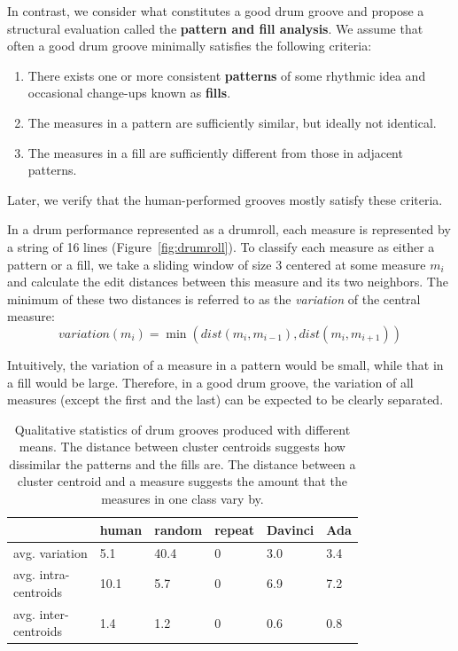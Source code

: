 \documentclass[letterpaper]{article} %
\begin{document}
In contrast, we consider what constitutes a good drum groove and propose a structural evaluation called the \textbf{pattern and fill analysis}. We assume that often a good drum groove minimally satisfies the following criteria:
\begin{enumerate}
    \item There exists one or more consistent \textbf{patterns} of some rhythmic idea and occasional change-ups known as \textbf{fills}.
    \item The measures in a pattern are sufficiently similar, but ideally not identical.
    \item The measures in a fill are sufficiently different from those in adjacent patterns.
\end{enumerate}

Later, we verify that the human-performed grooves mostly satisfy these criteria.

In a drum performance represented as a drumroll, each measure is represented by a string of 16 lines (Figure~\ref{fig:drumroll}). To classify each measure as either a pattern or a fill, we take a sliding window of size 3 centered at some measure $m_i$ and calculate the edit distances between this measure and its two neighbors. The minimum of these two distances is referred to as the \textit{variation} of the central measure:
$$\textit{variation}(m_i) = \min (dist(m_i,m_{i-1}),dist(m_i,m_{i+1}))$$

Intuitively, the variation of a measure in a pattern would be small, while that in a fill would be large. Therefore, in a good drum groove, the variation of all measures (except the first and the last) can be expected to be clearly separated.

\begin{table}[t!]
\small
\centering
\begin{tabular}{llllll}
\toprule
            & human & random & repeat & Davinci & Ada \\ \midrule
avg. variation   &  5.1  &  40.4 & 0  & 3.0  &  3.4   \\
\makecell[l]{avg. intra- \\ centroids}   &  10.1  &  5.7 & 0  & 6.9  &  7.2   \\
\makecell[l]{avg. inter- \\ centroids}   &  1.4  &  1.2 & 0  & 0.6  &  0.8   \\
\bottomrule
\end{tabular}
\caption{Qualitative statistics of drum grooves produced with different means. The distance between cluster centroids
 suggests how dissimilar the patterns and the fills are. The distance between a cluster centroid and a measure suggests the amount that the measures in one class vary by.}
\label{tab:variation}
\end{table}
\end{document}
